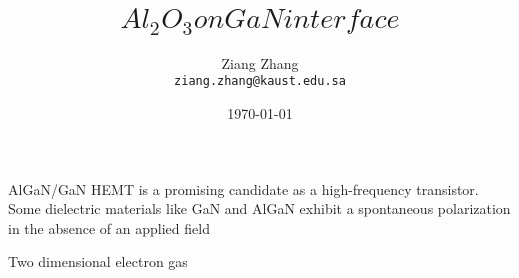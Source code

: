 \documentclass[a4paper, 11pt]{article}
\title{$Al_2O_3 on GaN interface$}
\author{Ziang Zhang \\ \texttt{ziang.zhang@kaust.edu.sa}}
\date{\today}
\numberwithin{equation}{subsection}
\begin{document}
\maketitle
\tableofcontents

AlGaN/GaN HEMT is a promising candidate as a high-frequency transistor. Some dielectric materials like GaN and AlGaN exhibit a spontaneous polarization in the absence of an applied field

Two dimensional electron gas


\newpage
%
\end{document}
